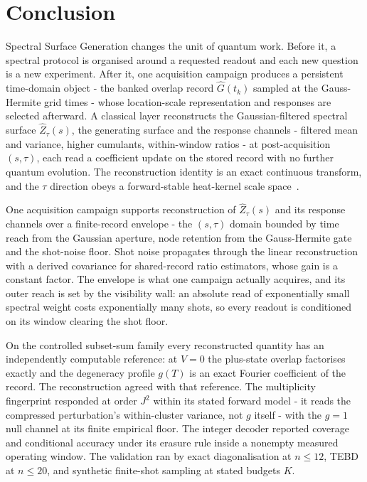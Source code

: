 \section{Conclusion}\label{sec:N8}

Spectral Surface Generation changes the unit of quantum work. Before it, a spectral protocol is organised around a requested readout and each new question is a new experiment. After it, one acquisition campaign produces a persistent time-domain object - the banked overlap record $\hat{G}(t_k)$ sampled at the Gauss-Hermite grid times - whose location-scale representation and responses are selected afterward. A classical layer reconstructs the Gaussian-filtered spectral surface $\hat{Z}_\tau(s)$, the generating surface and the response channels - filtered mean and variance, higher cumulants, within-window ratios - at post-acquisition $(s,\tau)$, each read a coefficient update on the stored record with no further quantum evolution. The reconstruction identity is an exact continuous transform, and the $\tau$ direction obeys a forward-stable heat-kernel scale space~\cite{witkin1983scale,koenderink1984structure,lindeberg1994scale}.

One acquisition campaign supports reconstruction of $\hat{Z}_\tau(s)$ and its response channels over a finite-record envelope - the $(s,\tau)$ domain bounded by time reach from the Gaussian aperture, node retention from the Gauss-Hermite gate and the shot-noise floor. Shot noise propagates through the linear reconstruction with a derived covariance for shared-record ratio estimators, whose gain is a constant factor. The envelope is what one campaign actually acquires, and its outer reach is set by the visibility wall: an absolute read of exponentially small spectral weight costs exponentially many shots, so every readout is conditioned on its window clearing the shot floor.

On the controlled subset-sum family every reconstructed quantity has an independently computable reference: at $V = 0$ the plus-state overlap factorises exactly and the degeneracy profile $g(T)$ is an exact Fourier coefficient of the record. The reconstruction agreed with that reference. The multiplicity fingerprint responded at order $J^2$ within its stated forward model - it reads the compressed perturbation's within-cluster variance, not $g$ itself - with the $g = 1$ null channel at its finite empirical floor. The integer decoder reported coverage and conditional accuracy under its erasure rule inside a nonempty measured operating window. The validation ran by exact diagonalisation at $n \le 12$, TEBD at $n \le 20$, and synthetic finite-shot sampling at stated budgets $K$.

